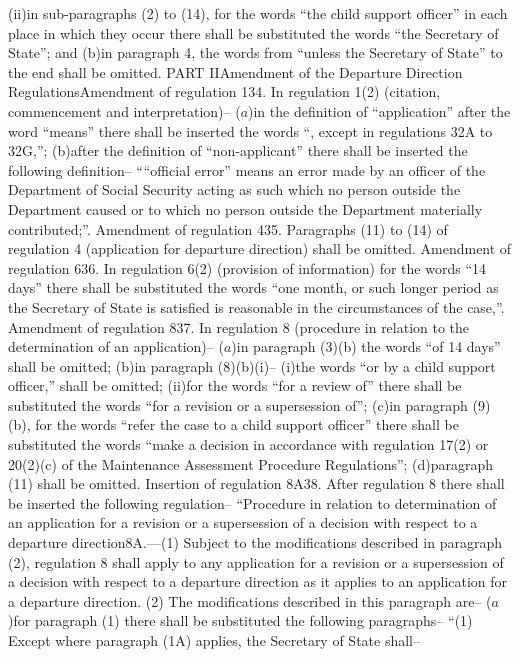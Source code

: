 \documentclass[12pt,a4paper]{article}
\begin{document}
(ii)in sub-paragraphs (2) to (14), for the words “the child support officer” in each place in which they occur there shall be substituted the words “the Secretary of State”; and
(b)in paragraph 4, the words from “unless the Secretary of State” to the end shall be omitted.
PART IIAmendment of the Departure Direction RegulationsAmendment of regulation 134.  In regulation 1(2) (citation, commencement and interpretation)–
($a$)in the definition of “application” after the word “means” there shall be inserted the words “, except in regulations 32A to 32G,”;
(b)after the definition of “non-applicant” there shall be inserted the following definition–
““official error” means an error made by an officer of the Department of Social Security acting as such which no person outside the Department caused or to which no person outside the Department materially contributed;”.
Amendment of regulation 435.  Paragraphs (11) to (14) of regulation 4 (application for departure direction) shall be omitted.
Amendment of regulation 636.  In regulation 6(2) (provision of information) for the words “14 days” there shall be substituted the words “one month, or such longer period as the Secretary of State is satisfied is reasonable in the circumstances of the case,”.
Amendment of regulation 837.  In regulation 8 (procedure in relation to the determination of an application)–
($a$)in paragraph (3)(b) the words “of 14 days” shall be omitted;
(b)in paragraph (8)(b)(i)–
(i)the words “or by a child support officer,” shall be omitted;
(ii)for the words “for a review of” there shall be substituted the words “for a revision or a supersession of”;
(c)in paragraph (9)(b), for the words “refer the case to a child support officer” there shall be substituted the words “make a decision in accordance with regulation 17(2) or 20(2)(c) of the Maintenance Assessment Procedure Regulations”;
(d)paragraph (11) shall be omitted.
Insertion of regulation 8A38.  After regulation 8 there shall be inserted the following regulation–
“Procedure in relation to determination of an application for a revision or a supersession of a decision with respect to a departure direction8A.—(1) Subject to the modifications described in paragraph (2), regulation 8 shall apply to any application for a revision or a supersession of a decision with respect to a departure direction as it applies to an application for a departure direction.
(2) The modifications described in this paragraph are–
($a$)for paragraph (1) there shall be substituted the following paragraphs–
“(1) Except where paragraph (1A) applies, the Secretary of State shall–
\end{document}
